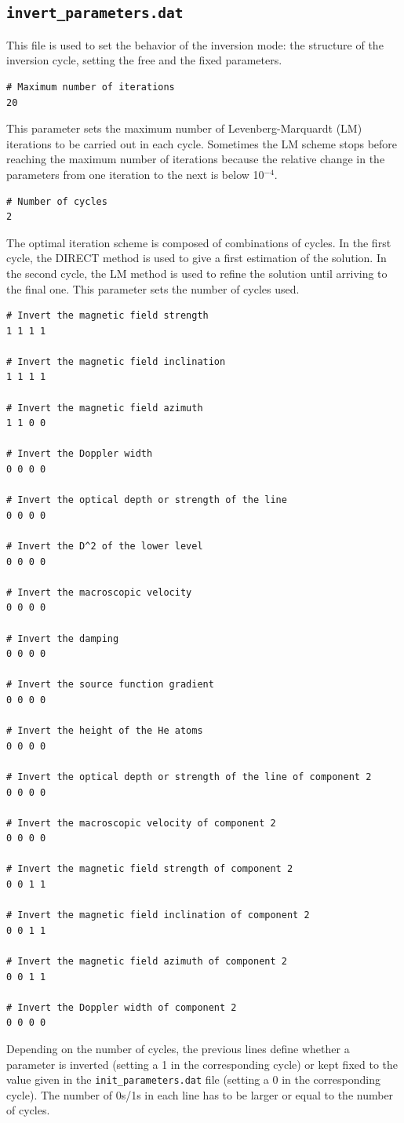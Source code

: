 \documentclass[12pt]{article}
\begin{document}
\subsection{\texttt{invert\_parameters.dat}}
\label{sec:invert_parameters}
This file is used to set the behavior of the inversion mode: the structure of the inversion cycle,
setting the free and the fixed parameters.

\begin{verbatim}
# Maximum number of iterations
20
\end{verbatim}
This parameter sets the maximum number of Levenberg-Marquardt (LM) iterations to be carried out
in each cycle. Sometimes the LM scheme stops before reaching the maximum number of iterations
because the relative change in the parameters from one iteration to the next is below 10$^{-4}$.

\begin{verbatim}
# Number of cycles
2
\end{verbatim}
The optimal iteration scheme is composed of combinations of cycles. In the first cycle, the DIRECT method
is used to give a first estimation of the solution. In the second cycle, the LM method is used to refine
the solution until arriving to the final one. This parameter sets the number of cycles used.

\begin{verbatim}
# Invert the magnetic field strength
1 1 1 1

# Invert the magnetic field inclination
1 1 1 1

# Invert the magnetic field azimuth
1 1 0 0

# Invert the Doppler width
0 0 0 0

# Invert the optical depth or strength of the line
0 0 0 0

# Invert the D^2 of the lower level
0 0 0 0

# Invert the macroscopic velocity
0 0 0 0

# Invert the damping
0 0 0 0

# Invert the source function gradient
0 0 0 0

# Invert the height of the He atoms
0 0 0 0

# Invert the optical depth or strength of the line of component 2
0 0 0 0

# Invert the macroscopic velocity of component 2
0 0 0 0

# Invert the magnetic field strength of component 2
0 0 1 1

# Invert the magnetic field inclination of component 2
0 0 1 1

# Invert the magnetic field azimuth of component 2
0 0 1 1

# Invert the Doppler width of component 2
0 0 0 0
\end{verbatim}
Depending on the number of cycles, the previous lines define whether a parameter is inverted (setting a 1 in the
corresponding cycle) or kept fixed to the value given in the \texttt{init\_parameters.dat} file (setting a 0
in the corresponding cycle). The number of 0s/1s in each line has to be larger or equal to the number of cycles.
\end{document}
